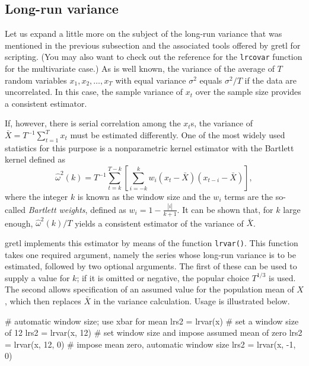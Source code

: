 \subsection{Long-run variance}
\label{sec:lrvar}

Let us expand a little more on the subject of the long-run variance 
that was mentioned in the previous subsection and the associated tools
offered by gretl for scripting. (You may also want to check out the 
reference for the \texttt{lrcovar} function for the multivariate case.)
As is well known, the variance of the average of $T$ random variables
$x_1, x_2, \ldots, x_T$ with equal variance $\sigma^2$ equals
$\sigma^2/T$ if the data are uncorrelated. In this case, the sample
variance of $x_t$ over the sample size provides a consistent estimator.

If, however, there is serial correlation among the $x_t$s, the
variance of $\bar{X} = T^{-1} \sum_{t=1}^T x_t$ must be estimated
differently. One of the most widely used statistics for this purpose
is a nonparametric kernel estimator with the Bartlett kernel defined
as
\begin{equation}
  \label{eq:scalar-lrvar}
  \hat{\omega}^2(k) = T^{-1} \sum_{t=k}^{T-k} \left[ \sum_{i=-k}^k w_i (x_t -
  \bar{X}) (x_{t-i} - \bar{X}) \right] ,
\end{equation}
where the integer $k$ is known as the window size and the $w_i$ terms
are the so-called \emph{Bartlett weights}, defined as $w_i = 1 -
\frac{|i|}{k + 1}$. It can be shown that, for $k$ large enough,
$\hat{\omega}^2(k)/T$ yields a consistent estimator of the variance of
$\bar{X}$.

gretl implements this estimator by means of the function
\texttt{lrvar()}. This function takes one required argument, namely
the series whose long-run variance is to be estimated, followed by two
optional arguments. The first of these can be used to supply a value
for $k$; if it is omitted or negative, the popular choice $T^{1/3}$ is
used. The second allows specification of an assumed value for the
population mean of $X$, which then replaces $\bar{X}$ in the variance
calculation. Usage is illustrated below.
\begin{code}
# automatic window size; use xbar for mean
lrs2 = lrvar(x)
# set a window size of 12
lrs2 = lrvar(x, 12)
# set window size and impose assumed mean of zero
lrs2 = lrvar(x, 12, 0)
# impose mean zero, automatic window size
lrs2 = lrvar(x, -1, 0)
\end{code}

